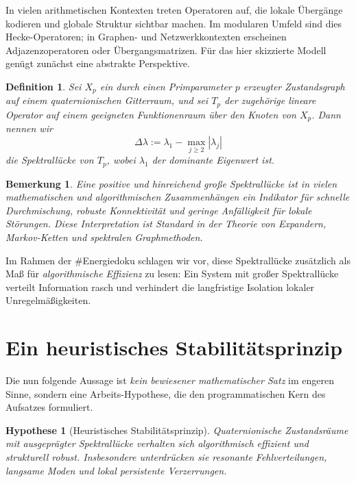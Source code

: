 \documentclass[12pt,a4paper]{article}
\newtheorem{definition}[theorem]{Definition}
\newtheorem{remark}[theorem]{Bemerkung}
\newtheorem{hypothesis}[theorem]{Hypothese}
\begin{document}
	In vielen arithmetischen Kontexten treten Operatoren auf, die lokale Übergänge kodieren und globale Struktur sichtbar machen. Im modularen Umfeld sind dies Hecke-Operatoren; in Graphen- und Netzwerkkontexten erscheinen Adjazenzoperatoren oder Übergangsmatrizen. Für das hier skizzierte Modell genügt zunächst eine abstrakte Perspektive.
	
	\begin{definition}
		Sei $X_p$ ein durch einen Primparameter $p$ erzeugter Zustandsgraph auf einem quaternionischen Gitterraum, und sei $T_p$ der zugehörige lineare Operator auf einem geeigneten Funktionenraum über den Knoten von $X_p$. Dann nennen wir
		\[
		\Delta\lambda := \lambda_1 - \max_{j\ge 2} |\lambda_j|
		\]
		die \emph{Spektrallücke} von $T_p$, wobei $\lambda_1$ der dominante Eigenwert ist.
	\end{definition}
	
	\begin{remark}
		Eine positive und hinreichend große Spektrallücke ist in vielen mathematischen und algorithmischen Zusammenhängen ein Indikator für schnelle Durchmischung, robuste Konnektivität und geringe Anfälligkeit für lokale Störungen. Diese Interpretation ist Standard in der Theorie von Expandern, Markov-Ketten und spektralen Graphmethoden.
	\end{remark}
	
	Im Rahmen der \#Energiedoku schlagen wir vor, diese Spektrallücke zusätzlich als Maß für \emph{algorithmische Effizienz} zu lesen: Ein System mit großer Spektrallücke verteilt Information rasch und verhindert die langfristige Isolation lokaler Unregelmäßigkeiten.
	
	\section{Ein heuristisches Stabilitätsprinzip}
	
	Die nun folgende Aussage ist \emph{kein bewiesener mathematischer Satz} im engeren Sinne, sondern eine Arbeits-Hypothese, die den programmatischen Kern des Aufsatzes formuliert.
	
	\begin{hypothesis}[Heuristisches Stabilitätsprinzip]
		Quaternionische Zustandsräume mit ausgeprägter Spektrallücke verhalten sich algorithmisch effizient und strukturell robust. Insbesondere unterdrücken sie resonante Fehlverteilungen, langsame Moden und lokal persistente Verzerrungen.
	\end{hypothesis}
	
\end{document}
